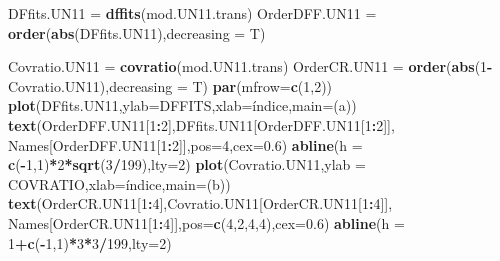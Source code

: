 \documentclass[
]{article}
\newenvironment{Shaded}{\begin{snugshade}}{\end{snugshade}}
\newcommand{\AttributeTok}[1]{\textcolor[rgb]{0.13,0.29,0.53}{#1}}
\newcommand{\DecValTok}[1]{\textcolor[rgb]{0.00,0.00,0.81}{#1}}
\newcommand{\FloatTok}[1]{\textcolor[rgb]{0.00,0.00,0.81}{#1}}
\newcommand{\FunctionTok}[1]{\textcolor[rgb]{0.13,0.29,0.53}{\textbf{#1}}}
\newcommand{\NormalTok}[1]{#1}
\newcommand{\OtherTok}[1]{\textcolor[rgb]{0.56,0.35,0.01}{#1}}
\newcommand{\SpecialCharTok}[1]{\textcolor[rgb]{0.81,0.36,0.00}{\textbf{#1}}}
\newcommand{\StringTok}[1]{\textcolor[rgb]{0.31,0.60,0.02}{#1}}
\begin{document}
\begin{Shaded}
\begin{Highlighting}[]
\NormalTok{DFfits.UN11 }\OtherTok{=} \FunctionTok{dffits}\NormalTok{(mod.UN11.trans)}
\NormalTok{OrderDFF.UN11 }\OtherTok{=} \FunctionTok{order}\NormalTok{(}\FunctionTok{abs}\NormalTok{(DFfits.UN11),}\AttributeTok{decreasing =}\NormalTok{ T)}

\NormalTok{Covratio.UN11 }\OtherTok{=} \FunctionTok{covratio}\NormalTok{(mod.UN11.trans)}
\NormalTok{OrderCR.UN11 }\OtherTok{=} \FunctionTok{order}\NormalTok{(}\FunctionTok{abs}\NormalTok{(}\DecValTok{1}\SpecialCharTok{{-}}\NormalTok{Covratio.UN11),}\AttributeTok{decreasing =}\NormalTok{ T)}
\FunctionTok{par}\NormalTok{(}\AttributeTok{mfrow=}\FunctionTok{c}\NormalTok{(}\DecValTok{1}\NormalTok{,}\DecValTok{2}\NormalTok{))}
\FunctionTok{plot}\NormalTok{(DFfits.UN11,}\AttributeTok{ylab=}\StringTok{\textquotesingle{}DFFITS\textquotesingle{}}\NormalTok{,}\AttributeTok{xlab=}\StringTok{\textquotesingle{}índice\textquotesingle{}}\NormalTok{,}\AttributeTok{main=}\StringTok{\textquotesingle{}(a)\textquotesingle{}}\NormalTok{)}
\FunctionTok{text}\NormalTok{(OrderDFF.UN11[}\DecValTok{1}\SpecialCharTok{:}\DecValTok{2}\NormalTok{],DFfits.UN11[OrderDFF.UN11[}\DecValTok{1}\SpecialCharTok{:}\DecValTok{2}\NormalTok{]],}
\NormalTok{     Names[OrderDFF.UN11[}\DecValTok{1}\SpecialCharTok{:}\DecValTok{2}\NormalTok{]],}\AttributeTok{pos=}\DecValTok{4}\NormalTok{,}\AttributeTok{cex=}\FloatTok{0.6}\NormalTok{)}
\FunctionTok{abline}\NormalTok{(}\AttributeTok{h =} \FunctionTok{c}\NormalTok{(}\SpecialCharTok{{-}}\DecValTok{1}\NormalTok{,}\DecValTok{1}\NormalTok{)}\SpecialCharTok{*}\DecValTok{2}\SpecialCharTok{*}\FunctionTok{sqrt}\NormalTok{(}\DecValTok{3}\SpecialCharTok{/}\DecValTok{199}\NormalTok{),}\AttributeTok{lty=}\DecValTok{2}\NormalTok{)}
\FunctionTok{plot}\NormalTok{(Covratio.UN11,}\AttributeTok{ylab =} \StringTok{\textquotesingle{}COVRATIO\textquotesingle{}}\NormalTok{,}\AttributeTok{xlab=}\StringTok{\textquotesingle{}índice\textquotesingle{}}\NormalTok{,}\AttributeTok{main=}\StringTok{\textquotesingle{}(b)\textquotesingle{}}\NormalTok{)}
\FunctionTok{text}\NormalTok{(OrderCR.UN11[}\DecValTok{1}\SpecialCharTok{:}\DecValTok{4}\NormalTok{],Covratio.UN11[OrderCR.UN11[}\DecValTok{1}\SpecialCharTok{:}\DecValTok{4}\NormalTok{]],}
\NormalTok{     Names[OrderCR.UN11[}\DecValTok{1}\SpecialCharTok{:}\DecValTok{4}\NormalTok{]],}\AttributeTok{pos=}\FunctionTok{c}\NormalTok{(}\DecValTok{4}\NormalTok{,}\DecValTok{2}\NormalTok{,}\DecValTok{4}\NormalTok{,}\DecValTok{4}\NormalTok{),}\AttributeTok{cex=}\FloatTok{0.6}\NormalTok{)}
\FunctionTok{abline}\NormalTok{(}\AttributeTok{h =} \DecValTok{1}\SpecialCharTok{+}\FunctionTok{c}\NormalTok{(}\SpecialCharTok{{-}}\DecValTok{1}\NormalTok{,}\DecValTok{1}\NormalTok{)}\SpecialCharTok{*}\DecValTok{3}\SpecialCharTok{*}\DecValTok{3}\SpecialCharTok{/}\DecValTok{199}\NormalTok{,}\AttributeTok{lty=}\DecValTok{2}\NormalTok{)}
\end{Highlighting}
\end{Shaded}
\end{document}
